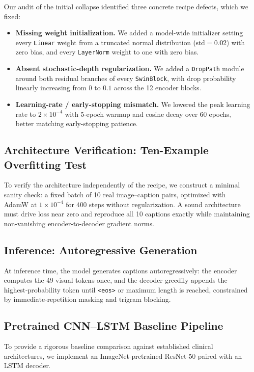 \documentclass[conference]{IEEEtran}
\begin{document}
Our audit of the initial collapse identified three concrete recipe defects, which we fixed:
\begin{itemize}
    \item \textbf{Missing weight initialization.} We added a model-wide initializer setting every \texttt{Linear} weight from a truncated normal distribution ($\text{std}=0.02$) with zero bias, and every \texttt{LayerNorm} weight to one with zero bias.
    \item \textbf{Absent stochastic-depth regularization.} We added a \texttt{DropPath} module around both residual branches of every \texttt{SwinBlock}, with drop probability linearly increasing from $0$ to $0.1$ across the 12 encoder blocks.
    \item \textbf{Learning-rate / early-stopping mismatch.} We lowered the peak learning rate to $2\times10^{-4}$ with 5-epoch warmup and cosine decay over 60 epochs, better matching early-stopping patience.
\end{itemize}

\subsection{Architecture Verification: Ten-Example Overfitting Test}
\label{sec:method-verify}
To verify the architecture independently of the recipe, we construct a minimal sanity check: a fixed batch of 10 real image--caption pairs, optimized with AdamW at $1\times10^{-4}$ for 400 steps without regularization. A sound architecture must drive loss near zero and reproduce all 10 captions exactly while maintaining non-vanishing encoder-to-decoder gradient norms.

\subsection{Inference: Autoregressive Generation}
\label{sec:method-inference}
At inference time, the model generates captions autoregressively: the encoder computes the 49 visual tokens once, and the decoder greedily appends the highest-probability token until \texttt{<eos>} or maximum length is reached, constrained by immediate-repetition masking and trigram blocking.

\subsection{Pretrained CNN--LSTM Baseline Pipeline}
\label{sec:method-cnn-lstm}
To provide a rigorous baseline comparison against established clinical architectures, we implement an ImageNet-pretrained ResNet-50 paired with an LSTM decoder.
\end{document}
